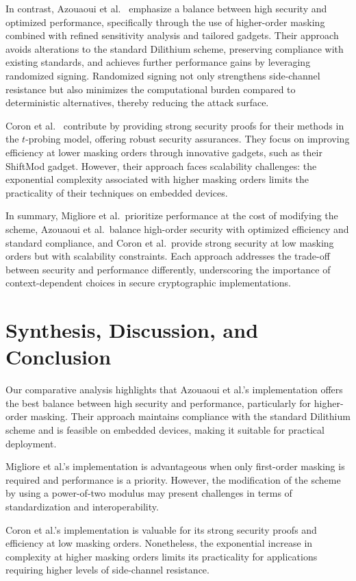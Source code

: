 In contrast, Azouaoui et al.\ \cite{Azouaoui22} emphasize a balance between high security and optimized performance, specifically through the use of higher-order masking combined with refined sensitivity analysis and tailored gadgets. Their approach avoids alterations to the standard Dilithium scheme, preserving compliance with existing standards, and achieves further performance gains by leveraging randomized signing. Randomized signing not only strengthens side-channel resistance but also minimizes the computational burden compared to deterministic alternatives, thereby reducing the attack surface.

Coron et al.\ \cite{Coron23} contribute by providing strong security proofs for their methods in the $t$-probing model, offering robust security assurances. They focus on improving efficiency at lower masking orders through innovative gadgets, such as their ShiftMod gadget. However, their approach faces scalability challenges: the exponential complexity associated with higher masking orders limits the practicality of their techniques on embedded devices.

In summary, Migliore et al.\ prioritize performance at the cost of modifying the scheme, Azouaoui et al.\ balance high-order security with optimized efficiency and standard compliance, and Coron et al.\ provide strong security at low masking orders but with scalability constraints. Each approach addresses the trade-off between security and performance differently, underscoring the importance of context-dependent choices in secure cryptographic implementations.

\section{Synthesis, Discussion, and Conclusion}

Our comparative analysis highlights that Azouaoui et al.'s implementation offers the best balance between high security and performance, particularly for higher-order masking. Their approach maintains compliance with the standard Dilithium scheme and is feasible on embedded devices, making it suitable for practical deployment.

Migliore et al.'s implementation is advantageous when only first-order masking is required and performance is a priority. However, the modification of the scheme by using a power-of-two modulus may present challenges in terms of standardization and interoperability.

Coron et al.'s implementation is valuable for its strong security proofs and efficiency at low masking orders. Nonetheless, the exponential increase in complexity at higher masking orders limits its practicality for applications requiring higher levels of side-channel resistance.

